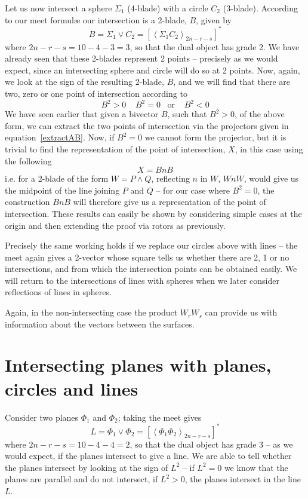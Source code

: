 Let us now intersect a sphere $\Sigma_1$ (4-blade) with a
circle $C_2$ (3-blade). According to our meet formul\ae
our intersection is a 2-blade, $B$, given by
%
\begin{equation}
B = \Sigma_1 \vee C_2 = \left[\left< \Sigma_1 C_2
\right>_{2n-r-s}\right]^*
\end{equation}
%
where $2n-r-s=10-4-3=3$, so that the dual object has
grade 2. We have already seen that these 2-blades
represent 2 points -- precisely as we would expect, since
an intersecting sphere and circle will do so at 2 points.
Now, again, we look at the sign of the resulting 2-blade,
$B$, and we will find that there are two, zero or one
point of intersection according to
%
\[  B^2>0 \;\;\;\; B^2=0 \;\;\;\mbox{or}\;\;\;\; B^2<0
\]
%
We have seen earlier that given a bivector $B$, such that
$B^2>0$, of the above form, we can extract the two points
of intersection via the projectors given in
equation~\ref{extractAB}. Now, if $B^2=0$ we cannot form
the projector, but it is trivial to find the representation of the point of
intersection, $X$, in this case using the following
%
\[  X = BnB  \]
%
i.e. for a 2-blade of the form $W = P\wedge Q$, reflecting
$n$ in $W$, $WnW$, would give us the midpoint of the line
joining $P$ and $Q$ -- for our case where $B^2=0$, the
construction $BnB$ will therefore give us a representation of the point of
intersection. These results can easily be shown by
considering simple cases at the origin and then extending
the proof via rotors as previously.

Precisely the same working holds if we replace our
circles above with lines -- the meet again gives a
2-vector whose square tells us whether there are 2, 1 or
no intersections, and from which the intersection points
can be obtained easily. We will return to the
intersections of lines with spheres when we later
consider reflections of lines in spheres.

Again, in the non-intersecting case the product $W_rW_s$
can provide us with information about the vectors between
the surfaces.




\section{Intersecting planes with planes, circles and lines }

Consider two planes $\Phi_1$ and $\Phi_2$; taking the
meet gives
%
\begin{equation}
L = \Phi_1 \vee \Phi_2 = \left[\left< \Phi_1 \Phi_2
\right>_{2n-r-s}\right]^*
\end{equation}
%
where $2n-r-s=10-4-4=2$, so that the dual object has
grade 3 -- as we would expect, if the planes intersect to
give a line. We are able to tell whether the planes
intersect by looking at the sign of $L^2$ -- if $L^2=0$
we know that the planes are parallel and do not
intersect, if $L^2>0$, the planes intersect in the line
$L$.


